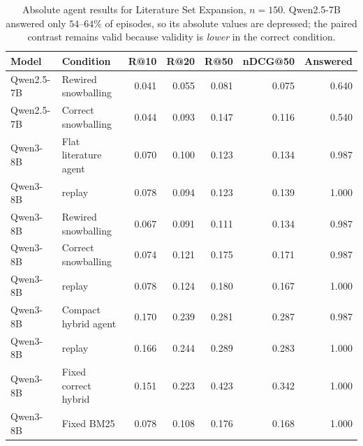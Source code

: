 \begin{table}[t]
\centering
\small
\caption{Absolute agent results for Literature Set Expansion, $n{=}150$. Qwen2.5-7B answered only
$54$--$64\%$ of episodes, so its absolute values are depressed; the paired contrast remains valid
because validity is \emph{lower} in the correct condition.}
\label{tab:ar-agent-lse}
\begin{tabular}{llrrrrr}
\toprule
Model & Condition & R@10 & R@20 & R@50 & nDCG@50 & Answered \\
\midrule
Qwen2.5-7B & Rewired snowballing & 0.041 & 0.055 & 0.081 & 0.075 & 0.640 \\
Qwen2.5-7B & Correct snowballing & 0.044 & 0.093 & 0.147 & 0.116 & 0.540 \\
\addlinespace
Qwen3-8B & Flat literature agent & 0.070 & 0.100 & 0.123 & 0.134 & 0.987 \\
Qwen3-8B & \quad replay & 0.078 & 0.094 & 0.123 & 0.139 & 1.000 \\
Qwen3-8B & Rewired snowballing & 0.067 & 0.091 & 0.111 & 0.134 & 0.987 \\
Qwen3-8B & Correct snowballing & 0.074 & 0.121 & 0.175 & 0.171 & 0.987 \\
Qwen3-8B & \quad replay & 0.078 & 0.124 & 0.180 & 0.167 & 1.000 \\
Qwen3-8B & Compact hybrid agent & 0.170 & 0.239 & 0.281 & 0.287 & 0.987 \\
Qwen3-8B & \quad replay & 0.166 & 0.244 & 0.289 & 0.283 & 1.000 \\
Qwen3-8B & Fixed correct hybrid & 0.151 & 0.223 & 0.423 & 0.342 & 1.000 \\
Qwen3-8B & Fixed BM25 & 0.078 & 0.108 & 0.176 & 0.168 & 1.000 \\
\bottomrule
\end{tabular}
\end{table}

